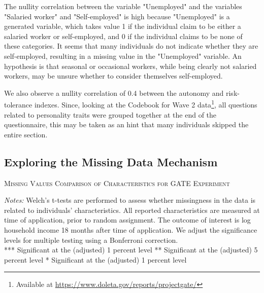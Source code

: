 The nullity correlation between the variable "Unemployed" and the variables "Salaried worker" and "Self-employed" is high because "Unemployed" is a generated variable, which takes value 1 if the individual claim to be either a salaried worker or self-employed, and 0 if the individual claims to be none of these categories. It seems that many individuals do not indicate whether they are self-employed, resulting in a missing value in the "Unemployed" variable. An hypothesis is that seasonal or occasional workers, while being clearly not salaried workers, may be unsure whether to consider themselves self-employed.

We also observe a nullity correlation of 0.4 between the autonomy and risk-tolerance indexes. Since, looking at the Codebook for Wave 2 data\footnote{Available at \url{https://www.doleta.gov/reports/projectgate/}}, all questions related to personality traits were grouped together at the end of the questionnaire, this may be taken as an hint that many individuals skipped the entire section.


\subsection{Exploring the Missing Data Mechanism}

\begin{table}[t!]
\centering
\caption{\textsc{Missing Values Comparison of Characteristics for GATE Experiment}}
\begin{adjustbox}{width=\textwidth,totalheight=\textheight,keepaspectratio}

\end{adjustbox}


\label{tab:table_missing}
\medskip
\raggedright
\footnotesize
\textit{Notes:} Welch's t-tests are performed to assess whether missingness in the data is related to individuals' characteristics.
All reported characteristics are measured at time of application, prior to random assignment. The outcome of interest is log household income 18 months after time of application. We adjust the significance levels for multiple testing using a Bonferroni correction. \\
*** Significant at the (adjusted) 1 percent level ** Significant at the (adjusted) 5 percent level * Significant at the (adjusted) 1 percent level
\end{table}

